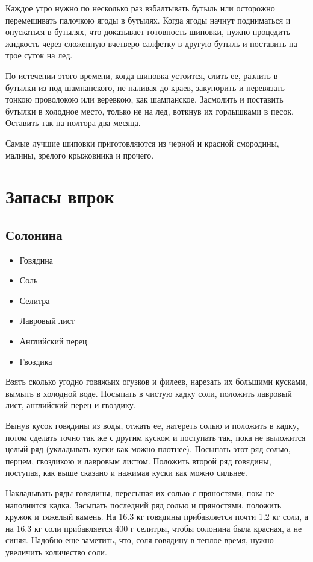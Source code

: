Каждое утро нужно по несколько раз взбалтывать бутыль или осторожно перемешивать палочкою ягоды в бутылях. Когда ягоды начнут подниматься и опускаться в бутылях, что доказывает готовность шиповки, нужно процедить жидкость через сложенную вчетверо салфетку в другую бутыль и поставить на трое суток на лед.

По истечении этого времени, когда шиповка устоится, слить ее, разлить в бутылки из-под шампанского, не наливая до краев, закупорить и перевязать тонкою проволокою или веревкою, как шампанское. Засмолить и поставить бутылки в холодное место, только не на лед, воткнув их горлышками в песок. Оставить так на полтора-два месяца.

Самые лучшие шиповки приготовляются из черной и красной смородины, малины, зрелого крыжовника и прочего.

\newpage
\section{Запасы впрок}

\subsection{Солонина}

\begin{itemize}
	\item Говядина 
    \item Соль 
    \item Селитра 
    \item Лавровый лист
    \item Английский перец 
    \item Гвоздика
\end{itemize}

Взять сколько угодно говяжьих огузков и филеев, нарезать их большими кусками, вымыть в холодной воде. Посыпать в чистую кадку соли, положить лавровый лист, английский перец и гвоздику.

Вынув кусок говядины из воды, отжать ее, натереть солью и положить в кадку, потом сделать точно так же с другим куском и поступать так, пока не выложится целый ряд (укладывать куски как можно плотнее). Посыпать этот ряд солью, перцем, гвоздикою и лавровым листом. Положить второй ряд говядины, поступая, как выше сказано и нажимая куски как можно сильнее.

Накладывать ряды говядины, пересыпая их солью с пряностями, пока не наполнится кадка. Засыпать последний ряд солью и пряностями, положить кружок и тяжелый камень. На 16.3 кг говядины прибавляется почти 1.2 кг соли, а на 16.3 кг соли прибавляется 400 г селитры, чтобы солонина была красная, а не синяя. Надобно еще заметить, что, соля говядину в теплое время, нужно увеличить количество соли.

